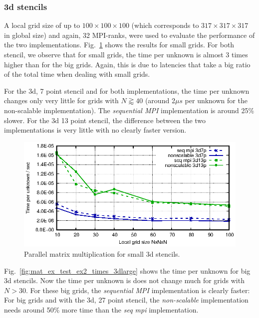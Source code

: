 \subsubsection*{3d stencils}
A local grid size of up to $100 \times 100 \times 100$ (which corresponds to $317 \times 317 \times 317$ in global size) and again, 32 MPI-ranks, were used to evaluate the performance of the two implementations.  Fig.~\ref{fig:mat_ex_test_ex2_times_3dsmall} shows the results for small grids. For both stencil, we observe that for small grids, the time per unknown is almost 3 times higher than for the big grids. Again, this is due to latencies that take a big ratio of the total time when dealing with small grids.

For the 3d, 7 point stencil and for both implementations, the time per unknown changes only very little for grids with $N \gtrapprox 40$ (around 2$\mu  s$ per unknown for the non-scalable implementation). The \textit{sequential MPI} implementation is around 25\% slower. For the 3d 13 point stencil, the difference between the two implementations is very little with no clearly faster version. 


\begin{figure}[tbp]
	\centering
	\vspace*{-2.5mm}\includegraphics[width=1\textwidth]{times_3dsmall}
	\caption{Parallel matrix multiplication for small 3d stencils. } 
	\label{fig:mat_ex_test_ex2_times_3dsmall}
\end{figure}

Fig.~\ref{fig:mat_ex_test_ex2_times_3dlarge} shows the time per unknown for big 3d stencils. Now the time per unknown is does not change much for grids with $N > 30$. For these big grids, the \textit{sequential MPI} implementation is clearly faster: For big grids and with the 3d, 27 point stencil, the \textit{non-scalable} implementation needs around 50\% more time than the \textit{seq mpi} implementation. 

